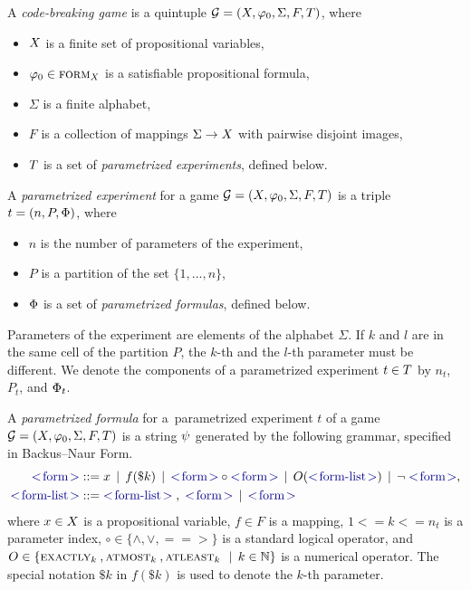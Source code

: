 \begin{definition} \label{def:game}
A \emph{code-breaking game} is a quintuple
  $\mathcal{G} = (X, \varphi_0, \Sigma, F, T)$, where
  \begin{itemize}
  \item $X$ is a finite set of propositional variables,
  \item $\varphi_0 \in \textsc{form}_X$ is a satisfiable propositional formula,
  \item $\Sigma$ is a finite alphabet,
  \item $F$ is a collection of mappings $\Sigma -> X$ with pairwise disjoint images,
  \item $T$ is a set of \emph{parametrized experiments}, defined below.
  \end{itemize}
\vspace{8mm}
\end{definition}
\vspace{-15mm}
\begin{definition} \label{def:exp}
A \emph{parametrized experiment} for a game
  $\mathcal{G} = (X, \varphi_0, \Sigma, F, T)$
  is a triple
  $t = (n, P, \Phi)$, where
  \begin{itemize}
  \item $n$ is the number of parameters of the experiment,
  \item $P$ is a partition of the set $\{1, ..., n\}$,
  \item $\Phi$ is a set of \emph{parametrized formulas}, defined below.
  \end{itemize}
Parameters of the experiment are elements of the alphabet $\Sigma$.
If $k$ and $l$ are in the same cell of the partition $P$, the $k$-th and
the $l$-th parameter must be different.
We denote the components of a parametrized experiment $t\in T$
  by $n_t$, $P_t$, and $\Phi_t$.
\vspace{8mm}
\end{definition}
\vspace{-15mm}
\begin{definition} \label{def-pform}
A \emph{parametrized formula} for a~parametrized experiment
$t$ of a game $\mathcal{G} = (X, \varphi_0, \Sigma, F, T)$
  is a string $\psi$ generated by the following grammar, specified in Backus–Naur Form.
\begin{align*}
\msymb{form} &::= x \| f(\$k) \| \msymb{form} \circ \msymb{form} \| O(\msymb{form-list})  \| \neg\; \msymb{form},\\
\msymb{form-list} &::= \msymb{form-list} \;,\; \msymb{form} \| \msymb{form}
\end{align*}
  where $x\in X$ is a propositional variable, $f\in F$ is a mapping, $1<= k <= n_t$ is a parameter index,
  $\circ\in\{\wedge, \vee, ==>\}$ is a standard logical operator,
  and $O\in\{ \textsc{exactly}_{k}\:, \textsc{atmost}_{k}\:, \textsc{atleast}_{k}\: \:\:|\:\: k\in\mathbb{N}\}$ is
  a numerical operator.
The special notation $\$k$ in $f(\$k)$ is used to denote the $k$-th parameter.
\end{definition}

